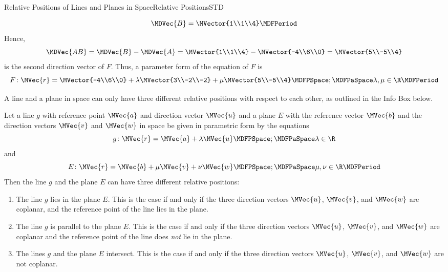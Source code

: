 \begin{MXContent}{Relative Positions of Lines and Planes in Space}{Relative Positions}{STD}
\begin{MExample}
\begin{itemize}
\[
 \MDVec{B}=\MVector{1\\1\\4} \MDFPeriod
\]
Hence, 
\[
 \MDVec{A B}=\MDVec{B}-\MDVec{A}=\MVector{1\\1\\4}-\MVector{-4\\6\\0}=\MVector{5\\-5\\4}
\]
is the second direction vector of $F$. Thus, a parameter form of the equation of $F$ is 
\[
 F\colon \MVec{r}=\MVector{-4\\6\\0}+\lambda\MVector{3\\-2\\-2}+\mu\MVector{5\\-5\\4}\MDFPSpace;\MDFPaSpace \lambda,\mu\in\R \MDFPeriod
\]

\end{itemize}
 
\end{MExample}

A line and a plane in space can only have three different relative positions with respect to each other, 
as outlined in the Info Box below.

\begin{MInfo}
Let a line $g$ with reference point $\MVec{a}$ and direction vector $\MVec{u}$ and a plane $E$ with 
the reference vector $\MVec{b}$ and the direction vectors $\MVec{v}$ and $\MVec{w}$ in space 
be given in parametric form by the equations 
\[
 g\colon\MVec{r}=\MVec{a}+\lambda\MVec{u}\MDFPSpace;\MDFPaSpace\lambda\in\R
\]
and
\[
 E\colon\MVec{r}=\MVec{b}+\mu\MVec{v}+\nu\MVec{w}\MDFPSpace;\MDFPaSpace\mu,\nu\in\R \MDFPeriod
\]
Then the line $g$ and the plane $E$ can have three different relative positions:
\begin{enumerate}
 \item The line $g$ lies in the plane $E$. This is the case if and only if the three 
  direction vectors $\MVec{u}$, $\MVec{v}$, and $\MVec{w}$ are coplanar, and the reference 
  point of the line lies in the plane.
 \item The line $g$ is parallel to the plane $E$. This is the case if and only if the three 
  direction vectors $\MVec{u}$, $\MVec{v}$, and $\MVec{w}$ are coplanar and the reference point 
  of the line does \textit{not} lie in the plane.
 \item The lines $g$ and the plane $E$ intersect. This is the case if and only if the three direction 
  vectors $\MVec{u}$, $\MVec{v}$, and $\MVec{w}$ are not coplanar.
\end{enumerate}


\end{MInfo}
\end{MXContent}
